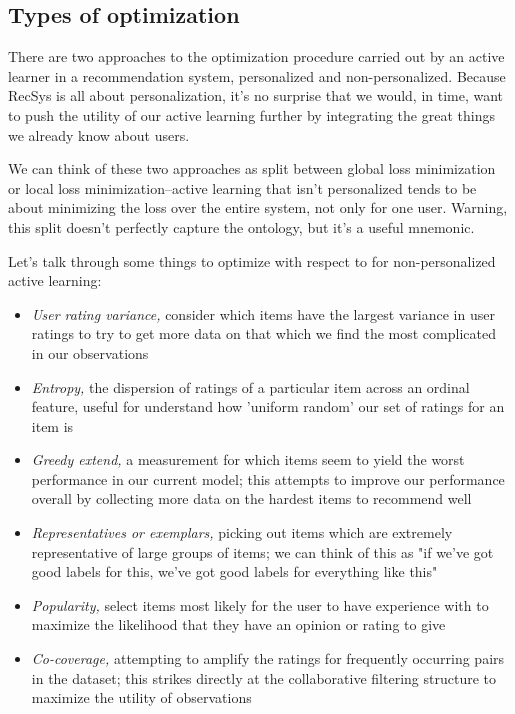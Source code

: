 \subsection{Types of optimization}

There are two approaches to the optimization procedure carried out by an active learner in a recommendation system, personalized and non-personalized. Because RecSys is all about personalization, it's no surprise that we would, in time, want to push the utility of our active learning further by integrating the great things we already know about users. 

We can think of these two approaches as split between global loss minimization or local loss minimization–active learning that isn't personalized tends to be about minimizing the loss over the entire system, not only for one user. Warning, this split doesn't perfectly capture the ontology, but it's a useful mnemonic.

Let's talk through some things to optimize with respect to for non-personalized active learning:

\begin{itemize}
\item \emph{User rating variance,} consider which items have the largest variance in user ratings to try to get more data on that which we find the most complicated in our observations
\item \emph{Entropy,} the dispersion of ratings of a particular item across an ordinal feature, useful for understand how 'uniform random' our set of ratings for an item is
\item \emph{Greedy extend,} a measurement for which items seem to yield the worst performance in our current model; this attempts to improve our performance overall by collecting more data on the hardest items to recommend well
\item \emph{Representatives or exemplars,} picking out items which are extremely representative of large groups of items; we can think of this as "if we've got good labels for this, we've got good labels for everything like this"
\item \emph{Popularity,} select items most likely for the user to have experience with to maximize the likelihood that they have an opinion or rating to give
\item \emph{Co-coverage,} attempting to amplify the ratings for frequently occurring pairs in the dataset; this strikes directly at the collaborative filtering structure to maximize the utility of observations
\end{itemize}

